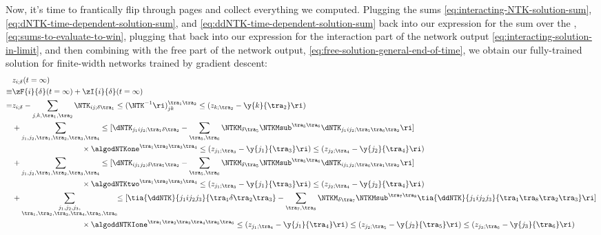 Now, it's time to frantically flip through pages and collect everything we computed.
Plugging the sums \eqref{eq:interacting-NTK-solution-sum}, \eqref{eq:dNTK-time-dependent-solution-sum}, and \eqref{eq:ddNTK-time-dependent-solution-sum} back into our expression for the sum over the , \eqref{eq:sums-to-evaluate-to-win}, plugging that back into our expression for the interaction part of the network output \eqref{eq:interacting-solution-in-limit}, and then combining with the free part of the network output, \eqref{eq:free-solution-general-end-of-time},
we obtain our fully-trained solution for finite-width networks trained by gradient descent:
\begin{align}\label{eq:very-general-finite-width-solution}
&z_{i;\delta}(t=\infty)\, \\
\equiv&\zF{i}{\delta}(t=\infty)+\zI{i}{\delta}(t=\infty)\, \notag \\
=&z_{i;\delta}-\sum_{j,k,\tra_1,\tra_2}\NTK_{ij;\delta\tra_1}\le(\NTK^{-1}\ri)_{jk}^{\tra_1\tra_2}\le(z_{k;\tra_2}-\y{k}{\tra_2}\ri)\, \notag\\
&+\sum_{j_1,j_2,\tra_1,\tra_2,\tra_3,\tra_4}\le[\dNTK_{j_1 i j_2;\tra_1\delta\tra_2}-\sum_{\tra_5,\tra_6}\NTKM_{\delta\tra_5}\NTKMsub^{\tra_5\tra_6}\dNTK_{j_1 i j_2;\tra_1\tra_6\tra_2}\ri]\, \notag\\
&\quad\quad\quad\quad\quad\quad\quad\quad\quad\times \algodNTKone^{\tra_1\tra_2\tra_3\tra_4}\le(z_{j_1;\tra_3}-\y{j_1}{\tra_3}\ri)\le(z_{j_2;\tra_4}-\y{j_2}{\tra_4}\ri)\, \notag \\
&+\sum_{j_1,j_2,\tra_1,\tra_2,\tra_3,\tra_4}\le[\dNTK_{i j_1j_2;\delta\tra_1\tra_2}-\sum_{\tra_5,\tra_6}\NTKM_{\delta\tra_5}\NTKMsub^{\tra_5\tra_6}\dNTK_{i j_1j_2;\tra_6\tra_1\tra_2}\ri]\, \notag\\
&\quad\quad\quad\quad\quad\quad\quad\quad\quad\times \algodNTKtwo^{\tra_1\tra_2\tra_3\tra_4}\le(z_{j_1;\tra_3}-\y{j_1}{\tra_3}\ri)\le(z_{j_2;\tra_4}-\y{j_2}{\tra_4}\ri)\, \notag\\
&+\sum_{\substack{ j_1,j_2,j_3, \\ \tra_1,\tra_2,\tra_3,\tra_4,\tra_5,\tra_6} }\!\! \le[ \tia{\ddNTK}{j_1i j_2j_3}{\tra_1\delta\tra_2\tra_3}-\sum_{\tra_7,\tra_8}\NTKM_{\delta\tra_7}\NTKMsub^{\tra_7\tra_8}\tia{\ddNTK}{j_1ij_2j_3}{\tra_1\tra_8\tra_2\tra_3}\ri] 
\notag \, \\
&\quad\quad\quad\quad\quad\quad\quad\quad\quad\times \algoddNTKIone^{\tra_1\tra_2\tra_3\tra_4\tra_5\tra_6}\le(z_{j_1;\tra_4}-\y{j_1}{\tra_4}\ri)\le(z_{j_2;\tra_5}-\y{j_2}{\tra_5}\ri)\le(z_{j_3;\tra_6}-\y{j_3}{\tra_6}\ri)\, \notag \\

\end{align}
